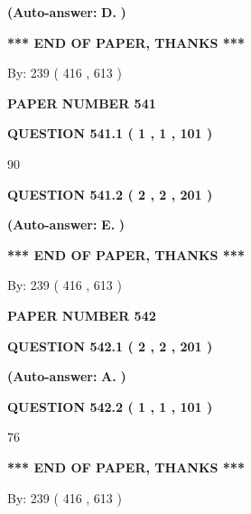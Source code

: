 \documentclass[12pt]{article}
\begin{document}
 
{\textbf{(Auto-answer:}}
{\textbf{\large{
D.}}}
{\textbf{)}}
 
 
   
   
   
   
\vspace{1.0in} 
{\textbf{\large{ *** END OF PAPER, THANKS *** }}} 
   
   
\hspace{1.0in} By: 
 239 ( 416 ,  613 )
   
   
   
   
\newpage 
\setcounter{page}{ 
   541001 } 
   
   
 {\textbf{ \Large{ PAPER NUMBER  541  }}}
   
   
   
   
  
  
{\textbf{\large{QUESTION
541.1 
 ( 1 , 1 , 101 )
}}}

90
  
  
{\textbf{\large{QUESTION
541.2 
 ( 2 , 2 , 201 )
}}}
 
 
{\textbf{(Auto-answer:}}
{\textbf{\large{
E.}}}
{\textbf{)}}
 
 
   
   
   
   
\vspace{1.0in} 
{\textbf{\large{ *** END OF PAPER, THANKS *** }}} 
   
   
\hspace{1.0in} By: 
 239 ( 416 ,  613 )
   
   
   
   
\newpage 
\setcounter{page}{ 
   542001 } 
   
   
 {\textbf{ \Large{ PAPER NUMBER  542  }}}
   
   
   
   
  
  
{\textbf{\large{QUESTION
542.1 
 ( 2 , 2 , 201 )
}}}
 
 
{\textbf{(Auto-answer:}}
{\textbf{\large{
A.}}}
{\textbf{)}}
 
 
  
  
{\textbf{\large{QUESTION
542.2 
 ( 1 , 1 , 101 )
}}}

76
   
   
   
   
\vspace{1.0in} 
{\textbf{\large{ *** END OF PAPER, THANKS *** }}} 
   
   
\hspace{1.0in} By: 
 239 ( 416 ,  613 )
   
   
   
\end{document}
